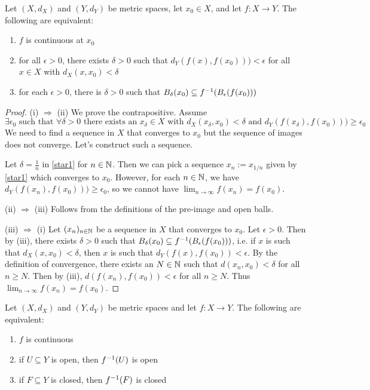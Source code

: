 \documentclass{article}
\begin{document}
\begin{theorem}
\label{thm:cont_equiv}
Let $(X,d_X)$ and $(Y,d_Y)$ be metric spaces, let $x_0 \in X$, and let $f:X\to Y$. The following are equivalent:
\begin{enumerate}
    \item[(i)] $f$ is continuous at $x_0$
    \item[(ii)] for all $\epsilon>0$, there exists $\delta > 0$ such that $d_Y(f(x),f(x_0))) < \epsilon$ for all $x \in X$ with $d_X(x,x_0) < \delta$
    \item[(iii)] for each $\epsilon>0$, there is $\delta > 0$ such that $B_\delta(x_0) \subseteq f^{-1} (B_\epsilon(f(x_0)))$
\end{enumerate}
\end{theorem}

\begin{proof}
(i) $\Rightarrow$ (ii) We prove the contrapositive. Assume
\begin{equation}
\label{star1} 
\exists \epsilon_0 \text{ such that } \forall \delta > 0 \text{ there exists an } x_\delta \in X \text{ with } d_X(x_\delta,x_0) < \delta \text{ and } d_Y(f(x_\delta),f(x_0))) \geq \epsilon_0
\tag{$\star$}
\end{equation}
We need to find a sequence in $X$ that converges to  $x_0$ but the sequence of images does not converge. Let's construct such a sequence. 

Let $\delta=\frac{1}{n}$ in \eqref{star1} for $n \in {\mathbb{N}}$. Then we can pick a sequence $x_n := x_{1/n}$ given by \eqref{star1} which converges to $x_0$. However, for each $n \in {\mathbb{N}}$, we have $d_Y(f(x_n),f(x_0))) \geq \epsilon_0$, so we cannot have $\lim_{n\to\infty}f(x_n)=f(x_0)$.

(ii) $\Rightarrow$ (iii) Follows from the definitions of the pre-image and open balls. 

(iii) $\Rightarrow$ (i) Let $(x_n)_{n\in{\mathbb{N}}}$ be a sequence in $X$ that converges to $x_0$. Let $\epsilon > 0$. Then by (iii), there exists $\delta > 0$ such that $B_\delta(x_0) \subseteq f^{-1} (B_\epsilon(f(x_0)))$, i.e. if $x$ is such that $d_X(x,x_0) < \delta$, then $x$ is such that  $d_Y(f(x),f(x_0)) < \epsilon$. By the definition of convergence, there exists an $N \in {\mathbb{N}}$ such that $d(x_n,x_0)< \delta$ for all $n \geq N$. Then by (iii), $d(f(x_n),f(x_0))< \epsilon$ for all $n \geq N$. Thus $\lim_{n\to\infty}f(x_n)=f(x_0)$.
\end{proof}

\begin{corollary}
\label{cor:open_closed}
Let $(X,d_X)$ and $(Y,d_Y)$ be metric spaces and let $f:X\to Y$. The following are equivalent:
\begin{enumerate}
    \item[(i)] $f$ is continuous
    \item[(ii)] if $U \subseteq Y$ is open, then $f^{-1}(U)$ is open
    \item[(iii)] if $F \subseteq Y$ is closed, then $f^{-1}(F)$ is closed
\end{enumerate}
\end{corollary}
\end{document}
